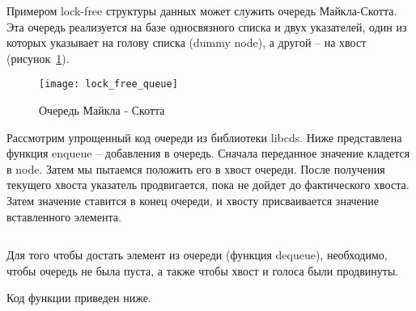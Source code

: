 Примером lock-free структуры данных может служить очередь Майкла-Скотта.
Эта очередь реализуется на базе односвязного списка и двух указателей, один из которых указывает на голову списка (dummy node), а другой -- на хвост (рисунок~\ref{fig:lock-free-queue}).

\begin{figure}[H]
    \centering
    \texttt{[image: lock\_free\_queue]}
    \caption{Очередь Майкла - Скотта}
    \label{fig:lock-free-queue}
\end{figure}

Рассмотрим упрощенный код очереди из библиотеки libcds.
Ниже представлена функция enqueue -- добавления в очередь.
Сначала переданное значение кладется в node.
Затем мы пытаемся положить его в хвост очереди.
После получения текущего хвоста указатель продвигается, пока не дойдет до фактического хвоста.
Затем значение ставится в конец очереди, и хвосту присваивается значение вставленного элемента.

\inputminted{c++}{listings/lockFreeQueueEnqueue.cpp}

Для того чтобы достать элемент из очереди (функция dequeue), необходимо, чтобы очередь не была пуста, а также чтобы хвост и голоса были продвинуты.

Код функции приведен ниже.
\inputminted{c++}{listings/lockFreeQueueDequeue.cpp}

